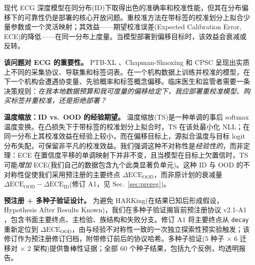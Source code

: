 现代 ECG 深度模型在同分布(ID)下取得出色的准确率和校准性能，但其在分布偏移下的可靠性仍是部署的核心开放问题\cite{ovadia2019calibration,guo2017calibration,wagner2020ptbxl}。重校准方法在带标签的校准划分上拟合少量参数或一个灵活映射；其效益——期望校准误差(Expected Calibration Error, ECE)的降低——在同一分布上度量。当模型部署到偏移目标时，该效益会衰减或反转。

\textbf{该问题对 ECG 的重要性。} PTB-XL \cite{wagner2020ptbxl}、Chapman-Shaoxing \cite{zheng2022ecgarrhythmia} 和 CPSC 呈现出实质上不同的采集协议、导联集和标签词表。在一个机构数据上训练并校准的模型，在下一个机构会遭遇协变量、先验概率和标签概念偏移\cite{morenotorres2012}。临床医生和监管者需要一条决策规则：\emph{在我本地数据预算和我可度量的偏移给定下，我应部署重校准模型、购买标签并重校准，还是拒绝部署？}

\textbf{温度缩放：ID vs.\ OOD 的经验期望。} 温度缩放(TS)是一种单调的事后 softmax 温度变换\cite{guo2017calibration}。在凸损失下于带标签的校准划分上拟合时，TS 在该处最小化 NLL；在同一分布上其校准效益在经验上较小，而在偏移目标上，源拟合温度与目标 logit 分布失配，可保留非平凡的校准效益。我们强调这种不对称性是\emph{经验性的}，而非定理：ECE 在置信度平移的单调映射下并非不变，且当模型在目标上欠置信时，TS 可能\emph{增加} ECE(我们自己的数据包含九个此类显著负单元)。这种 ID 与 OOD 的不对称性促使我们采用预注册的主要终点 $\Delta\text{ECE}_{\text{OOD}}$，而非原计划的衰减量 $\Delta\text{ECE}_{\text{OOD}}-\Delta\text{ECE}_{\text{ID}}$(修订 A1，见 Sec.~\ref{sec:prereg})。

\textbf{预注册 + 多种子验证设计。} 为避免 HARKing(在结果已知后形成假设，Hypothesis After Results Known)，我们在多种子验证揭盲前预注册协议 v2.1-A1 \cite{protocolv21a1}，包含书面主要终点、主检验、族结构和失败分支。修订 A1 将主要终点从 \texttt{decay} 重新定位到 $\Delta\text{ECE}_{\text{OOD}}$，由与经验不对称性一致的一次独立探索性预实验触发；该修订作为预注册修订归档\cite{nosek2019prereg,lakens2019prereg}，附带修订前后的协议哈希。多种子验证(5 种子 $\times$ 6 迁移对 $\times$ 2 架构)提供鲁棒性证据；全部 60 个种子结果，包括九个反例，均透明报告。

